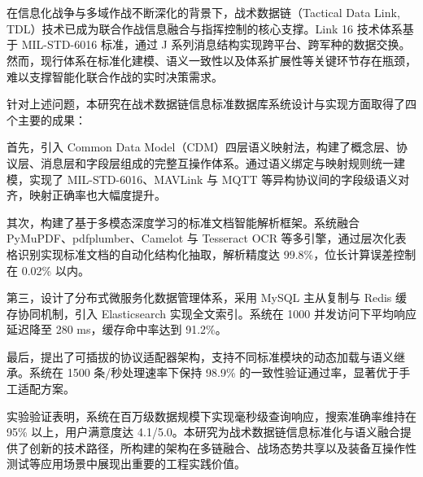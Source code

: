 \chapter*{\xiaosan{}}

在信息化战争与多域作战不断深化的背景下，战术数据链（Tactical Data Link, TDL）技术已成为联合作战信息融合与指挥控制的核心支撑。Link 16 技术体系基于 MIL-STD-6016 标准，通过 J 系列消息结构实现跨平台、跨军种的数据交换。然而，现行体系在标准化建模、语义一致性以及体系扩展性等关键环节存在瓶颈，难以支撑智能化联合作战的实时决策需求。

针对上述问题，本研究在战术数据链信息标准数据库系统设计与实现方面取得了四个主要的成果：

首先，引入 Common Data Model（CDM）四层语义映射法，构建了概念层、协议层、消息层和字段层组成的完整互操作体系。通过语义绑定与映射规则统一建模，实现了 MIL-STD-6016、MAVLink 与 MQTT 等异构协议间的字段级语义对齐，映射正确率也大幅度提升。

其次，构建了基于多模态深度学习的标准文档智能解析框架。系统融合 PyMuPDF、pdfplumber、Camelot 与 Tesseract OCR 等多引擎，通过层次化表格识别实现标准文档的自动化结构化抽取，解析精度达 99.8\%，位长计算误差控制在 0.02\% 以内。

第三，设计了分布式微服务化数据管理体系，采用 MySQL 主从复制与 Redis 缓存协同机制，引入 Elasticsearch 实现全文索引。系统在 1000 并发访问下平均响应延迟降至 280 ms，缓存命中率达到 91.2\%。

最后，提出了可插拔的协议适配器架构，支持不同标准模块的动态加载与语义继承。系统在 1500 条/秒处理速率下保持 98.9\% 的一致性验证通过率，显著优于手工适配方案。

实验验证表明，系统在百万级数据规模下实现毫秒级查询响应，搜索准确率维持在 95\% 以上，用户满意度达 4.1/5.0。本研究为战术数据链信息标准化与语义融合提供了创新的技术路径，所构建的架构在多链融合、战场态势共享以及装备互操作性测试等应用场景中展现出重要的工程实践价值。
\vspace{0.5cm}

